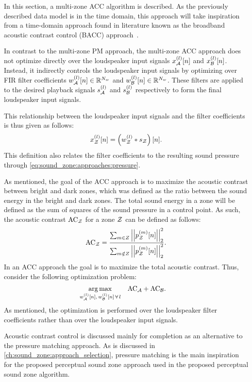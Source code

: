 In this section, a multi-zone ACC algorithm is described.
As the previously described data model is in the time domain, 
this approach will take inspiration from a time-domain approach found in literature known as the
broadband acoustic contrast control (BACC) approach~\cite{elliott2011regularisation, cai2014time, moller2016sound}.

In contrast to the multi-zone PM approach, the multi-zone ACC approach does not optimize directly over 
the loudspeaker input signals $x_{\mathcal{A}}^{(l)}[n]$ and $x_{\mathcal{B}}^{(l)}[n]$.
Instead, it indirectly controls the loudspeaker input signals by optimizing over 
FIR filter coefficients $w_{\mathcal{A}}^{(l)}[n]\in\mathbb{R}^{N_w}$ and $w_{\mathcal{B}}^{(l)}[n]\in\mathbb{R}^{N_w}$.
These filters are applied to the desired playback signals $s_{\mathcal{A}}^{(l)}$ and $s_{\mathcal{B}}^{(l)}$ 
respectively to form the final loudspeaker input signals.

This relationship between the loudspeaker input signals and the filter coefficients is thus given as follows:
\begin{equation}
    x_{\mathcal{Z}}^{(l)}[n] = \left(w_{\mathcal{Z}}^{(l)} \ast s_{\mathcal{Z}}\right)[n].
\end{equation}
This definition also relates the filter coefficients to the resulting sound pressure 
through \autoref{eq:sound_zone:approaches:pressure}.

As mentioned, the goal of the ACC approach is to maximize the acoustic contrast between bright and dark zones,
which was defined as the ratio between the sound energy in the bright and dark zones.
The total sound energy in a zone will be defined as the sum of squares of the sound pressure in a control point.
As such, the acoustic contrast $\text{AC}_{\mathcal{Z}}$ for a zone $\mathcal{Z}$ can be defined as follows: 
\begin{equation}
    \text{AC}_{\zz} = \frac{\sum_{m\in Z} \norm[2][2]{p_\zz^{(m)}[n]}}{\sum_{m\notin Z} \norm[2][2]{p_\zz^{(m)}[n]}}.
\end{equation}
In an ACC approach the goal is to maximize the total acoustic contrast.
Thus, consider the following optimization problem:
\begin{align}
    \operatorname*{arg\,max}_{w_{\mathcal{A}}^{(l)}[n],\,w_{\mathcal{B}}^{(l)}[n]\,\forall\,l}\quad 
       &\text{AC}_{\mathcal{A}} + \text{AC}_{\mathcal{B}}
   .
\end{align}
As mentioned, the optimization is performed over the loudspeaker filter coefficients rather than over the loudspeaker input signals.

Acoustic contrast control is discussed mainly for completion as an alternative to the pressure matching approach.
As is discussed in \autoref{ch:sound_zone:approach_selection}, 
pressure matching is the main inspiration for the proposed perceptual sound zone approach 
used in the proposed perceptual sound zone algorithm.
